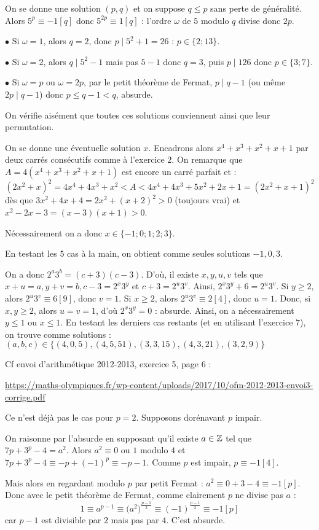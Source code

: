 \begin{sol}
On se donne une solution $(p,q)$ et on suppose $q\le p$ sans perte de généralité. Alors $5^p\equiv-1[q]$ donc $5^{2p}\equiv1[q]$ : l'ordre $\omega$ de $5$ modulo $q$ divise donc $2p$.

$\bullet$ Si $\omega=1$, alors $q=2$, donc $p\mid5^2+1=26$ : $p\in\{2;13\}.$

$\bullet$ Si $\omega=2$, alors $q\mid5^2-1$ mais pas $5-1$ donc $q=3$, puis $p\mid126$ donc $p\in\{3;7\}$.

$\bullet$ Si $\omega=p$ ou $\omega=2p$, par le petit théorème de Fermat, $p\mid q-1$ (ou même $2p\mid q-1$) donc $p\le q-1<q$, absurde.

On vérifie aisément que toutes ces solutions conviennent ainsi que leur permutation.
\end{sol}

\begin{sol}
On se donne une éventuelle solution $x$. Encadrons alors $x^4+x^3+x^2+x+1$ par deux carrés consécutifs comme à l'exercice $2$.
On remarque que $A=4(x^4+x^3+x^2+x+1)$ est encore un carré parfait et :
$$(2x^2+x)^2=4x^4+4x^3+x^2<A<4x^4+4x^3+5x^2+2x+1=(2x^2+x+1)^2$$
dès que $3x^2+4x+4=2x^2+(x+2)^2>0$ (toujours vrai) et $x^2-2x-3=(x-3)(x+1)>0$.

Nécessairement on a donc $x\in\{-1;0;1;2;3\}$.

En testant les $5$ cas à la main, on obtient comme seules solutions $-1,0,3$.
\end{sol}

\begin{sol} On a donc $2^a3^b=(c+3)(c-3)$.
D'où, il existe $x,y,u,v$ tels que $x+u=a, y+v=b, c-3=2^x3^y$ et $c+3=2^u3^v$. Ainsi, $2^x3^y+6=2^u3^v$.
Si $y\geq2$, alors $2^u3^v\equiv6[9]$, donc $v=1$.
Si $x\geq2$, alors $2^u3^v\equiv2[4]$, donc $u=1$.
Donc, si $x,y\geq2$, alors $u=v=1$, d'où $2^x3^y=0$ : absurde.
Ainsi, on a nécessairement $y\leq1$ ou $x\leq1$.
En testant les derniers cas restants (et en utilisant l'exercice $7$), on trouve comme solutions : $(a,b,c)\in \{(4,0,5),(4,5,51),(3,3,15),(4,3,21),(3,2,9)\}$
\end{sol}

\begin{sol}
Cf envoi d'arithmétique 2012-2013, exercice 5, page 6 :

\url{https://maths-olympiques.fr/wp-content/uploads/2017/10/ofm-2012-2013-envoi3-corrige.pdf}
\end{sol}


\begin{sol}
Ce n'est déjà pas le cas pour $p=2$. Supposons dorénavant $p$ impair.

On raisonne par l'absurde en supposant qu'il existe $a\in\mathbb Z$ tel que $7p+3^p-4=a^2$.
Alors $a^2\equiv0$ ou $1$ modulo $4$ et $7p+3^p-4\equiv-p+(-1)^p\equiv-p-1$.
Comme $p$ est impair, $p\equiv-1[4]$.

Mais alors en regardant modulo $p$ par petit Fermat : $a^2\equiv0+3-4\equiv-1[p]$.
Donc avec le petit théorème de Fermat, comme clairement $p$ ne divise pas $a$ : $$1\equiv a^{p-1}\equiv\big(a^2\big)^{\frac{p-1}2}\equiv(-1)^{\frac{p-1}2}\equiv-1[p]$$
car $p-1$ est divisible par $2$ mais pas par $4$. C'est absurde.
\end{sol}


